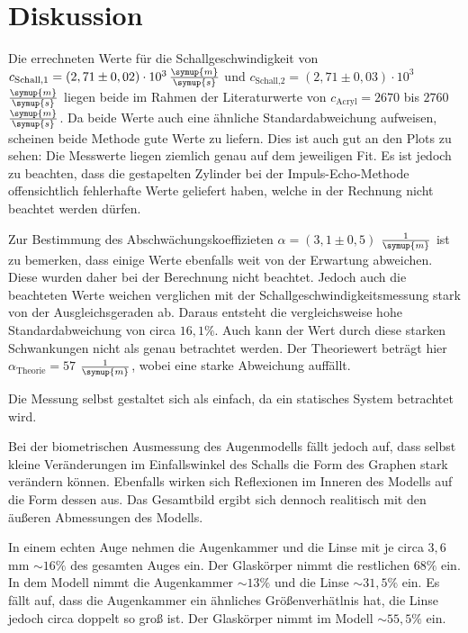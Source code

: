 \section{Diskussion}
\label{sec:Diskussion}


Die errechneten Werte für die Schallgeschwindigkeit von $c_\text{Schall,1} = (2,71 \pm 0,02) \cdot 10^{3} \, \frac{\symup{m}}{\symup{s}}$ und $c_\text{Schall,2} = (2,71 \pm 0,03) \cdot 10^{3}$ $\frac{\symup{m}}{\symup{s}}$
liegen beide im Rahmen der Literaturwerte von $c_\text{Acryl} = 2670$ bis $2760$ $\frac{\symup{m}}{\symup{s}}$\cite{acryl}.
Da beide Werte auch eine ähnliche Standardabweichung aufweisen, scheinen beide Methode gute Werte zu liefern. Dies ist auch gut an den Plots zu sehen:
Die Messwerte liegen ziemlich genau auf dem jeweiligen Fit.
Es ist jedoch zu beachten, dass die gestapelten Zylinder bei der Impuls-Echo-Methode offensichtlich fehlerhafte Werte geliefert haben, welche in der Rechnung nicht beachtet werden dürfen.

Zur Bestimmung des Abschwächungskoeffizieten $\alpha = (3,1 \pm 0,5)$ $\frac{1}{\symup{m}}$ ist zu bemerken, dass einige Werte ebenfalls weit von der Erwartung abweichen. Diese wurden daher bei der Berechnung nicht beachtet.
Jedoch auch die beachteten Werte weichen verglichen mit der Schallgeschwindigkeitsmessung stark von der Ausgleichsgeraden ab.
Daraus entsteht die vergleichsweise hohe Standardabweichung von circa $16,1 \%$. Auch kann der Wert durch diese starken Schwankungen nicht als genau betrachtet werden.
Der Theoriewert beträgt hier $\alpha_\text{Theorie} = 57$ $\frac{1}{\symup{m}}$, wobei eine starke Abweichung auffällt.

Die Messung selbst gestaltet sich als einfach, da ein statisches System betrachtet wird.

Bei der biometrischen Ausmessung des Augenmodells fällt jedoch auf, dass selbst kleine Veränderungen im Einfallswinkel des Schalls die Form des Graphen stark verändern können.
Ebenfalls wirken sich Reflexionen im Inneren des Modells auf die Form dessen aus. Das Gesamtbild ergibt sich dennoch realitisch mit den äußeren Abmessungen des Modells.

In einem echten Auge nehmen die Augenkammer und die Linse mit je circa $3,6$ mm $\sim \! 16\%$ des gesamten Auges ein.
Der Glaskörper nimmt die restlichen $68 \%$ ein. In dem Modell nimmt die Augenkammer $\sim \! 13\%$ und die Linse $\sim \! 31,5 \%$ ein.
Es fällt auf, dass die Augenkammer ein ähnliches Größenverhätlnis hat, die Linse jedoch circa doppelt so groß ist.
Der Glaskörper nimmt im Modell $\sim \! 55,5 \%$ ein.

